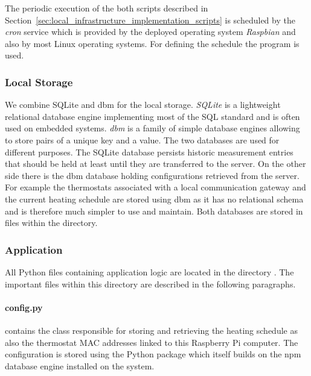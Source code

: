 The periodic execution of the both scripts described in Section~\ref{sec:local_infrastructure_implementation_scripts} is scheduled by the \emph{cron} service which is provided by the deployed operating system \emph{Raspbian} and also by most Linux operating systems.
For defining the schedule the  program is used.

\subsubsection{Local Storage}
\label{sec:local_infrastructure_implementation_storage}

We combine SQLite and dbm for the local storage.
\emph{SQLite} is a lightweight relational database engine implementing most of the SQL standard and is often used on embedded systems.
\emph{dbm} is a family of simple database engines allowing to store pairs of a unique key and a value.
The two databases are used for different purposes.
The SQLite database persists historic measurement entries that should be held at least until they are transferred to the server.
On the other side there is the dbm database holding configurations retrieved from the server.
For example the thermostats associated with a local communication gateway and the current heating schedule are stored using dbm as it has no relational schema and is therefore much simpler to use and maintain.
Both databases are stored in files within the  directory.

\subsubsection{Application}

All Python files containing application logic are located in the directory .
The important files within this directory are described in the following paragraphs.


\paragraph{config.py} contains the  class responsible for storing and retrieving the heating schedule as also the thermostat MAC addresses linked to this Raspberry Pi computer.
The configuration is stored using the  Python package which itself builds on the npm database engine installed on the system.

